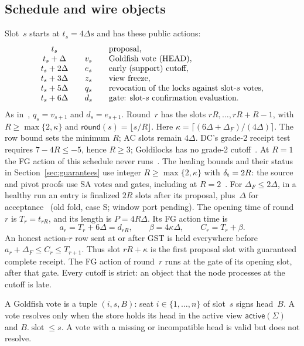 \documentclass{article}
\theoremstyle{plain}
\theoremstyle{definition}
\theoremstyle{remark}
\newcommand{\slot}{\operatorname{slot}}
\newcommand{\round}{\mathsf{round}}
\newcommand{\act}{\mathsf{active}}
\newcommand{\DC}[1]{\cite[\S#1]{DC}}
\newcommand{\SAS}{\cite{SAS}}
\begin{document}
\subsection{Schedule and wire objects}\label{sec:schedule}

Slot~$s$ starts at $t_s=4\Delta s$ and has these public actions:
\[
\begin{array}{c@{\qquad}c@{\qquad}l}
 t_s        &      & \text{proposal},\\
 t_s+\Delta  & v_s & \text{Goldfish vote (HEAD)},\\
 t_s+2\Delta & e_s & \text{early (support) cutoff},\\
 t_s+3\Delta & z_s & \text{view freeze},\\
 t_s+5\Delta & q_s & \text{revocation of the locks against slot-$s$ votes},\\
 t_s+6\Delta & d_s & \text{gate: slot-$s$ confirmation evaluation}.
\end{array}
\]
As in~\SAS, $q_s=v_{s+1}$ and $d_s=e_{s+1}$.  Round~$r$ has the slots
$rR,\dots,rR+R-1$, with $R\geq\max\{2,\kappa\}$ and $\round(s)=\lfloor s/R\rfloor$.
Here $\kappa=\lceil(6\Delta+\Delta_F)/(4\Delta)\rceil$.
The row bound sets the minimum $R$; AC slots remain $4\Delta$.
DC's grade-2 receipt test requires $7-4R\leq-5$, hence $R\geq3$;
Goldilocks has no grade-2 cutoff~\DC{6.1}.
At $R=1$ the FG action of this schedule never runs~\cite[T12]{FL}.
The healing bounds and their status in Section~\ref{sec:guarantees} use
integer $R\geq\max\{2,\kappa\}$ with $\delta_{\rm t}=2R$: the source and pivot
proofs use SA votes and gates, including at $R=2$~\cite[H.21]{BPH}.
For $\Delta_F\leq2\Delta$, in a healthy
run an entry is finalized $2R$ slots after its proposal, plus~$\Delta$
for acceptance~\cite[\S3.5]{FL} (old fold, case S; window port pending).  The opening time of round~$r$ is
$T_r=t_{rR}$, and its length is $P=4R\Delta$.  Its FG action time is
\[
 a_r=T_r+6\Delta=d_{rR},\qquad
 \beta=4\kappa\Delta,\qquad C_r=T_r+\beta.
\]
An honest action-$r$ row sent at or after GST is held everywhere before
$a_r+\Delta_F\leq C_r\leq T_{r+1}$.  Thus slot $rR+\kappa$ is
the first proposal slot with guaranteed complete receipt.
The FG action of round~$r$ runs at the gate of its opening slot,
after that gate.  Every cutoff is strict: an object that the node
processes at the cutoff is late.

A Goldfish vote is a tuple $(i,s,B)$: seat $i\in\{1,\dots,n\}$ of
slot~$s$ signs head~$B$.  A vote resolves only when the store holds its
head in the active view $\act(\Sigma)$ and $B.\slot\leq s$.  A vote with a
missing or incompatible head is valid but does not resolve.
\end{document}

